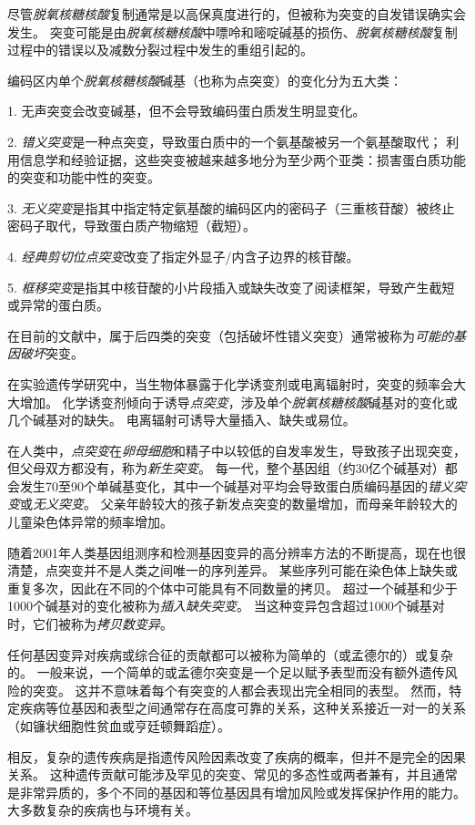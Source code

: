 \begin{proposition}[突变：遗传多样性的起源] \label{box:2_1}
	
	\quad \quad 尽管\textit{脱氧核糖核酸}复制通常是以高保真度进行的，但被称为突变的自发错误确实会发生。
	突变可能是由\textit{脱氧核糖核酸}中嘌呤和嘧啶碱基的损伤、\textit{脱氧核糖核酸}复制过程中的错误以及减数分裂过程中发生的重组引起的。
	
	
	\quad \quad 编码区内单个\textit{脱氧核糖核酸}碱基（也称为点突变）的变化分为五大类：
	
	
	1. 无声突变会改变碱基，但不会导致编码蛋白质发生明显变化。
	
	
	2. \textit{错义突变}是一种点突变，导致蛋白质中的一个氨基酸被另一个氨基酸取代；
	利用信息学和经验证据，这些突变被越来越多地分为至少两个亚类：损害蛋白质功能的突变和功能中性的突变。
	
	
	3. \textit{无义突变}是指其中指定特定氨基酸的编码区内的密码子（三重核苷酸）被终止密码子取代，导致蛋白质产物缩短（截短）。
	
	
	4. \textit{经典剪切位点突变}改变了指定外显子/内含子边界的核苷酸。
	
	5. \textit{框移突变}是指其中核苷酸的小片段插入或缺失改变了阅读框架，导致产生截短或异常的蛋白质。
	
	\quad \quad 在目前的文献中，属于后四类的突变（包括破坏性错义突变）通常被称为\textit{可能的基因破坏}突变。
	
	\quad \quad 在实验遗传学研究中，当生物体暴露于化学诱变剂或电离辐射时，突变的频率会大大增加。
	化学诱变剂倾向于诱导\textit{点突变}，涉及单个\textit{脱氧核糖核酸}碱基对的变化或几个碱基对的缺失。
	电离辐射可诱导大量插入、缺失或易位。
	
	\quad \quad 在人类中，\textit{点突变}在\textit{卵母细胞}和精子中以较低的自发率发生，导致孩子出现突变，但父母双方都没有，称为\textit{新生突变}。
	每一代，整个基因组（约30亿个碱基对）都会发生70至90个单碱基变化，其中一个碱基对平均会导致蛋白质编码基因的\textit{错义突变}或\textit{无义突变}。
	父亲年龄较大的孩子新发点突变的数量增加，而母亲年龄较大的儿童染色体异常的频率增加。
	
	
	\quad \quad 随着2001年人类基因组测序和检测基因变异的高分辨率方法的不断提高，现在也很清楚，点突变并不是人类之间唯一的序列差异。
	某些序列可能在染色体上缺失或重复多次，因此在不同的个体中可能具有不同数量的拷贝。
	超过一个碱基和少于1000个碱基对的变化被称为\textit{插入缺失突变}。
	当这种变异包含超过1000个碱基对时，它们被称为\textit{拷贝数变异}。
	
	
	\quad \quad 任何基因变异对疾病或综合征的贡献都可以被称为简单的（或孟德尔的）或复杂的。
	一般来说，一个简单的或孟德尔突变是一个足以赋予表型而没有额外遗传风险的突变。
	这并不意味着每个有突变的人都会表现出完全相同的表型。
	然而，特定疾病等位基因和表型之间通常存在高度可靠的关系，这种关系接近一对一的关系（如镰状细胞性贫血或亨廷顿舞蹈症）。
	
	
	\quad \quad 相反，复杂的遗传疾病是指遗传风险因素改变了疾病的概率，但并不是完全的因果关系。
	这种遗传贡献可能涉及罕见的突变、常见的多态性或两者兼有，并且通常是非常异质的，多个不同的基因和等位基因具有增加风险或发挥保护作用的能力。
	大多数复杂的疾病也与环境有关。
	
		
\end{proposition}



